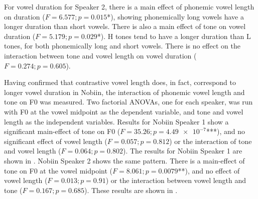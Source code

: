 \documentclass[output=paper]{langscibook}
\begin{document}
For vowel duration for Speaker 2, there is a main effect of phonemic vowel length on duration ($F=6.577; p=0.015$*), showing phonemically long vowels have a longer duration than short vowels. There is also a main effect of tone on vowel duration ($F=5.179; p=0.029$*). H tones tend to have a longer duration than L tones, for both phonemically long and short vowels. There is no effect on the interaction between tone and vowel length on vowel duration ($F=0.274; p=0.605$).

Having confirmed that contrastive vowel length does, in fact, correspond to longer vowel duration in Nobiin, the interaction of phonemic vowel length and tone on F0 was measured. Two factorial ANOVAs, one for each speaker, was run with F0 at the vowel midpoint as the dependent variable, and tone and vowel length as the independent variables. Results for Nobiin Speaker 1 show a significant main-effect of tone on F0 ($F=35.26; p=\num{4.49e-7}$***), and no significant effect of vowel length ($F=0.057; p=0.812$) or the interaction of tone and vowel length ($F=0.064; p=0.802$). The results for Nobiin Speaker 1 are shown in . Nobiin Speaker 2 shows the same pattern. There is a main-effect of tone on F0 at the vowel midpoint ($F=8.061; p=0.0079$**), and no effect of vowel length ($F=0.013; p=0.91$) or the interaction between vowel length and tone ($F=0.167; p=0.685$). These results are shown in .
\end{document}
